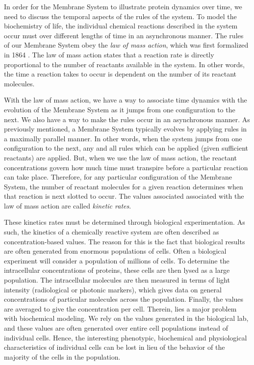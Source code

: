 \documentclass[copyright]{eptcs}
\begin{document}
In order for the Membrane System to illustrate protein dynamics over time, we need to discuss the temporal aspects of the rules of the system.  To model the biochemistry of life, the individual chemical reactions described in the system occur must over different lengths of time in an asynchronous manner.  The rules of our Membrane System obey the \emph{law of mass action}, which was first formalized in 1864 \cite{guldberg1864ii,guldberg1864i,waage1864}.  The law of mass action states that a reaction rate is directly proportional to the number of reactants available in the system.  In other words, the time a reaction takes to occur is dependent on the number of its reactant molecules.

With the law of mass action, we have a way to associate time dynamics with the evolution of the Membrane System as it jumps from one configuration to the next.  We also have a way to make the rules occur in an asynchronous manner.  As previously mentioned, a Membrane System typically evolves by applying rules in a maximally parallel manner.  In other words, when the system jumps from one configuration to the next, any and all rules which can be applied (given sufficient reactants) are applied.  But, when we use the law of mass action, the reactant concentrations govern how much time must transpire before a particular reaction can take place.  Therefore, for any particular configuration of the Membrane System, the number of reactant molecules for a given reaction determines when that reaction is next slotted to occur.  The values associated associated with the law of mass action are called \emph{kinetic rates}.

These kinetics rates must be determined through biological experimentation.  As such, the kinetics of a chemically reactive system are often described as concentration-based values.  The reason for this is the fact that biological results are often generated from enormous populations of cells.  Often a biological experiment will consider a population of millions of cells.  To determine the intracellular concentrations of proteins, these cells are then lysed as a large population.  The intracellular molecules are then measured in terms of light intensity (radiological or photonic markers), which gives data on general concentrations of particular molecules across the population.  Finally, the values are averaged to give the concentration per cell.  Therein, lies a major problem with biochemical modeling.  We rely on the values generated in the biological lab, and these values are often generated over entire cell populations instead of individual cells.  Hence, the interesting phenotypic, biochemical and physiological characteristics of individual cells can be lost in lieu of the behavior of the majority of the cells in the population.
\end{document}
